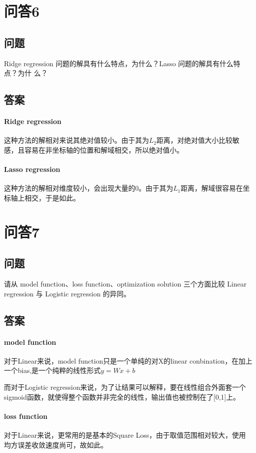 \documentclass[UTF8]{ctexart}
\begin{document}
\section{问答6}
\subsection{问题}Ridge regression 问题的解具有什么特点，为什么？Lasso 问题的解具有什么特点？为什
么？
\subsection{答案}
\paragraph{Ridge regression}
这种方法的解相对来说其绝对值较小。由于其为$L_2$距离，对绝对值大小比较敏感，且容易在非坐标轴的位置和解域相交，所以绝对值小。
\paragraph{Lasso regression}
这种方法的解相对维度较小，会出现大量的0。由于其为$L_1$距离，解域很容易在坐标轴上相交，于是如此。
\section{问答7}
\subsection{问题}
请从 model function、loss function、optimization solution 三个方面比较 Linear regression
与 Logistic regression 的异同。
\subsection{答案}
\paragraph{model function}
对于Linear来说，model function只是一个单纯的对X的linear conbination，在加上一个bias,是一个纯粹的线性形式$y=Wx+b$

而对于Logistic regression来说，为了让结果可以解释，要在线性组合外面套一个sigmoid函数，就使得整个函数并非完全的线性，输出值也被控制在了[0,1]上。

\paragraph{loss function}
对于Linear来说，更常用的是基本的Square Loss，由于取值范围相对较大，使用均方误差收敛速度尚可，故如此。
\end{document}

